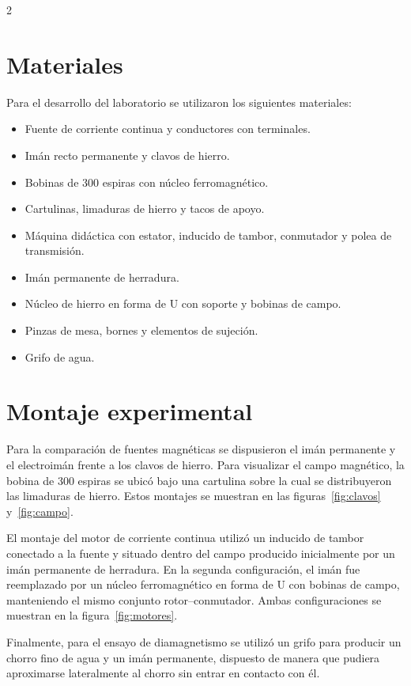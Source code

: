 \documentclass[10pt,letterpaper]{article}
\begin{document}
\begin{multicols}{2}
\section{Materiales}

Para el desarrollo del laboratorio se utilizaron los siguientes materiales:

\begin{itemize}
    \item Fuente de corriente continua y conductores con terminales.
    \item Imán recto permanente y clavos de hierro.
    \item Bobinas de 300 espiras con núcleo ferromagnético.
    \item Cartulinas, limaduras de hierro y tacos de apoyo.
    \item Máquina didáctica con estator, inducido de tambor, conmutador y polea de transmisión.
    \item Imán permanente de herradura.
    \item Núcleo de hierro en forma de U con soporte y bobinas de campo.
    \item Pinzas de mesa, bornes y elementos de sujeción.
    \item Grifo de agua.
\end{itemize}

\section{Montaje experimental}

Para la comparación de fuentes magnéticas se dispusieron el imán permanente y el electroimán frente a los clavos de hierro. Para visualizar el campo magnético, la bobina de 300 espiras se ubicó bajo una cartulina sobre la cual se distribuyeron las limaduras de hierro. Estos montajes se muestran en las figuras~\ref{fig:clavos} y~\ref{fig:campo}.

El montaje del motor de corriente continua utilizó un inducido de tambor conectado a la fuente y situado dentro del campo producido inicialmente por un imán permanente de herradura. En la segunda configuración, el imán fue reemplazado por un núcleo ferromagnético en forma de U con bobinas de campo, manteniendo el mismo conjunto rotor--conmutador. Ambas configuraciones se muestran en la figura~\ref{fig:motores}.

Finalmente, para el ensayo de diamagnetismo se utilizó un grifo para producir un chorro fino de agua y un imán permanente, dispuesto de manera que pudiera aproximarse lateralmente al chorro sin entrar en contacto con él.


\end{multicols}
\end{document}
